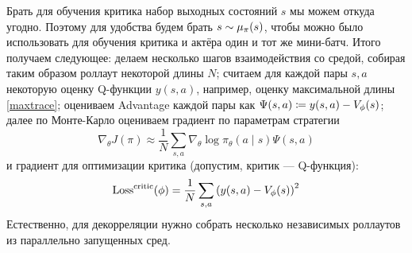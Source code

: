 

Брать для обучения критика набор выходных состояний $s$ мы можем откуда угодно. Поэтому для удобства будем брать $s \HM\sim \mu_\pi(s)$, чтобы можно было использовать для обучения критика и актёра один и тот же мини-батч. Итого получаем следующее: делаем несколько шагов взаимодействия со средой, собирая таким образом роллаут некоторой длины $N$; считаем для каждой пары $s, a$ некоторую оценку Q-функции $y(s, a)$, например, оценку максимальной длины \eqref{maxtrace}; оцениваем Advantage каждой пары как $\Psi(s, a) \HM \coloneqq y(s, a) \HM- V_{\phi}(s)$; далее по Монте-Карло оцениваем градиент по параметрам стратегии
$$\nabla_\theta J(\pi) \approx \frac{1}{N} \sum_{s, a} \nabla_{\theta} \log \pi_\theta (a \mid s) \Psi(s, a)$$
и градиент для оптимизации критика (допустим, критик --- Q-функция):
$$\operatorname{Loss}^{\mathrm{critic}}(\phi) = \frac{1}{N} \sum_{s, a} \left( y(s, a) - V_{\phi}(s) \right)^2$$
Естественно, для декорреляции нужно собрать несколько независимых роллаутов из параллельно запущенных сред.


